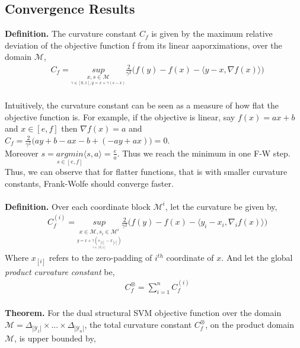 \documentclass{article}
\begin{document}
\subsection*{Convergence Results}
\textbf{Definition.} The curvature constant $C_{f}$ is given by the maximum relative deviation of the objective function f from its linear aaporximations, over the domain $\mathcal{M}$,
\begin{equation*}
\begin{aligned}
    &C_{f}= \underset{\underset{ \gamma\in[0,1], y=x+\gamma(s-x)}{x,s\in\mathcal{M}}}{sup}\frac{2}{\gamma^{2}}\Big(f(y)- f(x)- \langle y-x, \nabla f(x)\rangle\Big)
\end{aligned}
\end{equation*}
\\
Intuitively, the curvature constant can be seen as a measure of how flat the objective function is. For example, if the objective is linear, say $f(x)= ax+ b$ and $x\in[e,f]$ then $\nabla f(x)= a$ and $C_{f}= \frac{2}{\gamma^{2}}\Big(ay+ b- ax- b +(-ay +ax)\Big)= 0$.\\
Moreover $s=\underset{s\in[e,f]}{argmin}\langle s, a\rangle= \frac{e}{a}$. Thus we reach the minimum in one F-W step.\\
Thus, we can observe that for flatter functions, that is with smaller curvature constants, Frank-Wolfe should converge faster.
\\
\\
\textbf{Definition.} Over each coordinate block $\mathcal{M}^{i}$, let the curvature be given by,
\begin{equation*}
\begin{aligned}
    &C^{(i)}_{f}= \underset{\underset{\underset{\gamma\in[0,1]}{y=x+\gamma(s_{[i]}-x_{[i]})}}{x\in\mathcal{M},s_{i}\in\mathcal{M}^{i}}}{sup}\frac{2}{\gamma^{2}}\Big(f(y)- f(x)- \langle y_{i}-x_{i}, \nabla_{i} f(x)\rangle\Big)
\end{aligned}
\end{equation*}
Where $x_{[i]}$ refers to the zero-padding of $i^{th}$ coordinate of $x$. And let the global \emph{product curvature constant} be,
\begin{equation*}
\begin{aligned}
    &C^{\otimes}_{f}= \sum_{i=1}^{n}C^{(i)}_{f}
\end{aligned}
\end{equation*}
\\
\textbf{Theorem.} For the dual structural SVM objective function over the domain $\mathcal{M}= \Delta_{|\mathcal{Y}_{1}|}\times... \times\Delta_{|\mathcal{Y}_{n}|}$, the total curvature constant $C^{\otimes}_{f}$, on the product domain $\mathcal{M}$, is upper bounded by,
\end{document}
